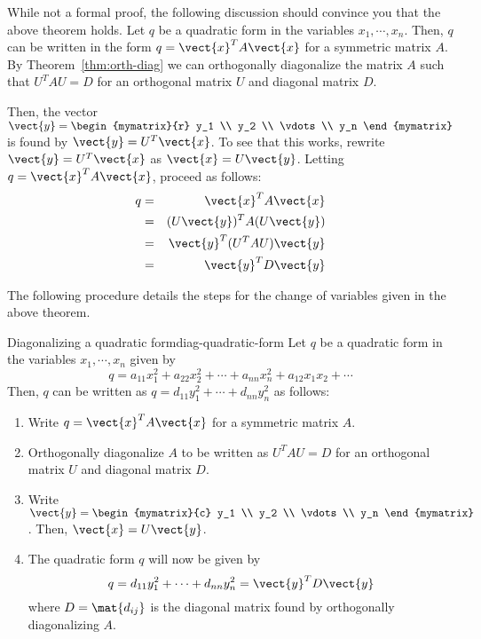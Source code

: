 While not a formal proof, the following discussion should convince you that the above theorem holds. Let $q$ be a quadratic form in the variables $x_1, \cdots, x_n$. Then, $q$ can be written in the form $q = \vect{x}^T A \vect{x}$ for a symmetric matrix $A$.  
By Theorem~\ref{thm:orth-diag} we can orthogonally diagonalize the matrix $A$ such that $U^TAU = D$ for an orthogonal matrix $U$ and diagonal matrix $D$. 

Then, the vector $\vect{y} = \begin{mymatrix}{r}
y_1 \\
y_2 \\
\vdots \\
y_n
\end{mymatrix}
$ is found by $\vect{y} = U^T \vect{x}$. To see that this works, rewrite $\vect{y} = U^T \vect{x}$ as $\vect{x} = U\vect{y}$. Letting $q = \vect{x}^TA\vect{x}$, proceed as follows:
\begin{eqnarray*}
q &=& \vect{x}^T A \vect{x}\\
&=& (U\vect{y})^T A (U\vect{y})\\
&=& \vect{y}^T (U^TAU) \vect{y} \\
&=& \vect{y}^T D \vect{y}
\end{eqnarray*}

The following procedure details the steps for the change of variables given in the above theorem. 

\begin{procedure}{Diagonalizing a quadratic form}{diag-quadratic-form}
Let $q$ be a quadratic form in the variables $x_1, \cdots, x_n$ given by 
\[
q = a_{11}x_1^2 + a_{22}x_2^2 + \cdots + a_{nn}x_n^2 + a_{12}x_1x_2+\cdots
\]
Then, $q$ can be written as $q = d_{11}y_1^2 + \cdots + d_{nn}y_n^2$ as follows:

\begin{enumerate}
\item
Write $q = \vect{x}^T A \vect{x}$ for a symmetric matrix $A$. 

\item
Orthogonally diagonalize $A$ to be written as $U^TAU=D$ for an orthogonal matrix $U$ and diagonal matrix $D$. 

\item
Write $\vect{y} = \begin{mymatrix}{c}
y_1 \\
y_2 \\
\vdots \\
y_n
\end{mymatrix}$. Then, $\vect{x} = U \vect{y}$. 

\item 
The quadratic form $q$ will now be given by 
\[
q = d_{11}y_1^2 + \cdots + d_{nn}y_n^2 = \vect{y}^T D \vect{y}
\]
where $D = \mat{d_{ij} }$ is the diagonal matrix found by orthogonally diagonalizing $A$. 
\end{enumerate}
\end{procedure}

